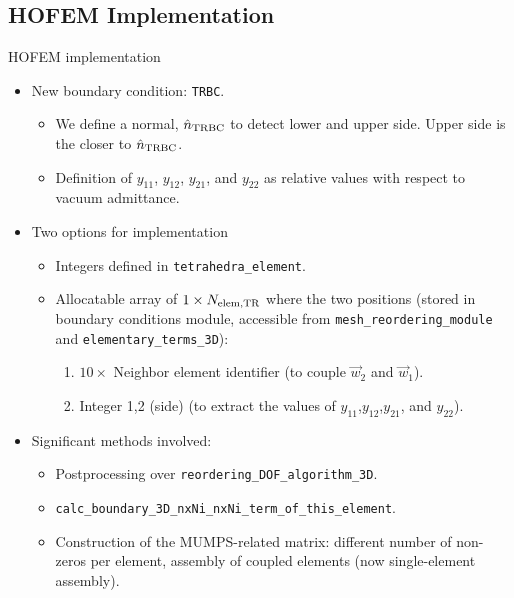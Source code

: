 \subsection{HOFEM Implementation}

\begin{frame}{HOFEM implementation}
  \begin{itemize}
    \item New boundary condition: \texttt{TRBC}.
    \begin{itemize}
      \item We define a normal, $\hat{n}_{\rm TRBC}$ to detect lower and upper side. Upper side is the closer to $\hat{n}_{\rm TRBC}$.
      \item Definition of $y_{11}$, $y_{12}$, $y_{21}$, and $y_{22}$ as relative values with respect to vacuum admittance.
    \end{itemize}
    \item Two options for implementation 
    \begin{itemize}
      \item Integers defined in \texttt{tetrahedra\_element}.
      \item Allocatable array of $1\times N_{\rm elem, TR}$ where the two positions (stored in boundary conditions module, 
      accessible from \texttt{mesh\_reordering\_module} and \texttt{elementary\_terms\_3D}):
      \begin{enumerate}
        \item $10\times$ Neighbor element identifier (to couple $\vec{w}_2$ and $\vec{w}_1$).
        \item Integer 1,2 (side) (to extract the values of $y_{11}$,$y_{12}$,$y_{21}$, and $y_{22}$).
      \end{enumerate}
    \end{itemize}
    \item Significant methods involved:
    \begin{itemize}
      \item Postprocessing over \texttt{reordering\_DOF\_algorithm\_3D}. 
      \item \texttt{calc\_boundary\_3D\_nxNi\_nxNi\_term\_of\_this\_element}.
      \item Construction of the MUMPS-related matrix: different number of
      non-zeros per element, assembly of coupled elements (now single-element
      assembly).
    \end{itemize}   
  \end{itemize}
\end{frame}

